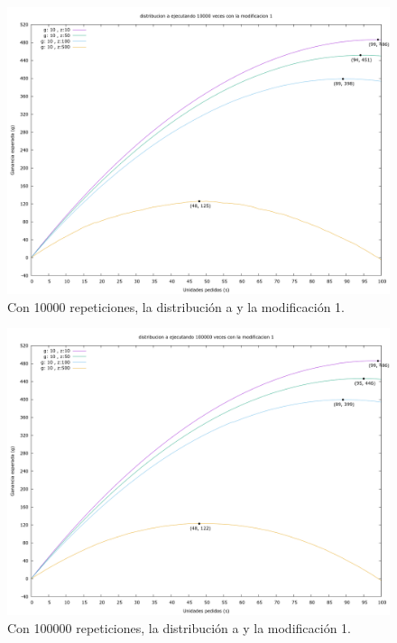 \documentclass[12pt, spanish]{article}
\begin{document}
\begin{figure}[H]
	\centering
	\includegraphics[scale = 0.2]{prob_a/datos_a_10000_1.png}
	\caption{Con 10000 repeticiones, la distribución a y la modificación 1.}
	\label{fig:ej1_a_10000}

\end{figure}

\begin{figure}[H]
	\centering
	\includegraphics[scale = 0.2]{prob_a/datos_a_100000_1.png}
	\caption{Con 100000 repeticiones, la distribución a y la modificación 1.}
	\label{fig:ej1_a_100000}

\end{figure}
\end{document}

